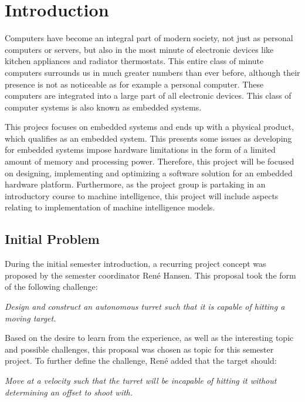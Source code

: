 \chapter{Introduction}
Computers have become an integral part of modern society, not just as personal
computers or servers, but also in the most minute of electronic devices
like kitchen appliances and radiator thermostats. This entire class of minute
computers surrounds us in much greater numbers than ever before, although their
presence is not as noticeable as for example a personal computer. These
computers are integrated into a large part of all electronic devices. This class
of computer systems is also known as embedded systems.\nl


This projecs focuses on embedded systems and ends up with a physical product,
which qualifies as an embedded system. This presents some issues as
developing for embedded systems impose hardware limitations in the form of a
limited amount of memory and processing power. Therefore, this project will be
focused on designing, implementing and optimizing a software solution for an
embedded hardware platform. Furthermore, as the project group is partaking in
an introductory course to machine intelligence, this project will include
aspects relating to implementation of machine intelligence models.

\section{Initial Problem}\label{InitialProblem}
During the initial semester introduction, a recurring project concept was
proposed by the semester coordinator Ren\'e Hansen. This proposal took the
form of the following challenge:

\begin{center}
\begin{minipage}{0.8\linewidth}
\textit{Design and construct an autonomous turret such that it is capable of
hitting a moving target.}
\end{minipage}
\end{center}

Based on the desire to learn from the experience, as well as the interesting
topic and possible challenges, this proposal was chosen as topic for this
semester project. To further define the challenge, Ren\'e added that the target
should:
\begin{center}
\begin{minipage}{0.8\linewidth}
\textit{Move at a velocity such that the turret will be incapable
of hitting it without determining an offset to shoot with.}
\end{minipage}
\end{center}

